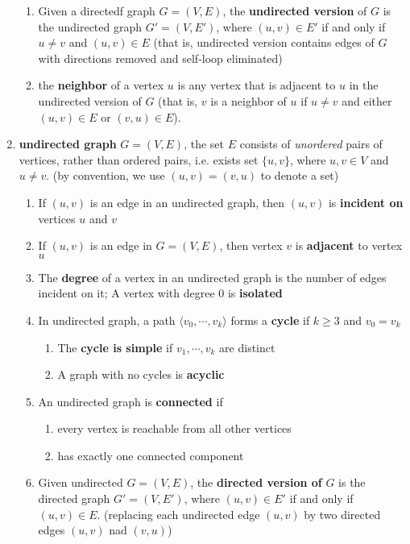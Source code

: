 \documentclass[11pt]{article}
\begin{document}
\begin{defn*}
\begin{enumerate}
\begin{enumerate}
            \item Given a directedf graph $G =  (V, E)$, the \textbf{undirected version} of $G$ is the undirected graph $G' = (V,E')$, where $(u,v) \in E'$ if and only if $u\neq v$ and $(u,v)\in E$ (that is, undirected version contains edges of $G$ with directions removed and self-loop eliminated)
            \item the \textbf{neighbor} of a vertex $u$ is any vertex that is adjacent to $u$ in the undirected version of $G$ (that is, $v$ is a neighbor of $u$ if $u\neq v$ and either $(u,v)\in E$ or $(v,u)\in E$).
        \end{enumerate}
        \item \textbf{undirected graph} $G = (V, E)$, the set $E$ consists of \textit{unordered} pairs of vertices, rather than ordered pairs, i.e. exists set $\{ u, v\}$, where $u, v \in V$ and $u \neq v$. (by convention, we use $(u,v) = (v, u)$ to denote a set)
        \begin{enumerate}
            \item If $(u,v)$ is an edge in an undirected graph, then $(u, v)$ is \textbf{incident on} vertices $u$ and $v$
            \item If $(u,v)$ is an edge in $G = (V,E)$, then vertex $v$ is \textbf{adjacent} to vertex $u$
            \item The \textbf{degree} of a vertex in an undirected graph is the number of edges incident on it; A vertex with degree 0 is \textbf{isolated}
            \item In undirected graph, a path $\langle v_0, \cdots, v_k \rangle$ forms a \textbf{cycle} if $k\geq 3$ and $v_0 = v_k$ 
            \begin{enumerate}
                \item The \textbf{cycle is simple} if $v_1, \cdots, v_k$ are distinct 
                \item A graph with no cycles is \textbf{acyclic}
            \end{enumerate}
            \item An undirected graph is \textbf{connected} if 
            \begin{enumerate}
                \item every vertex is reachable from all other vertices 
                \item has exactly one connected component 
            \end{enumerate}
            \item Given undirected $G = (V,E)$, the \textbf{directed version of} $G$ is the directed graph $G' = (V, E')$, where $(u,v) \in E'$ if and only if $(u,v)\in E$. (replacing each undirected edge $(u,v)$ by two directed edges $(u,v)$ nad $(v,u)$)

\end{enumerate}
\end{enumerate}
\end{defn*}
\end{document}
